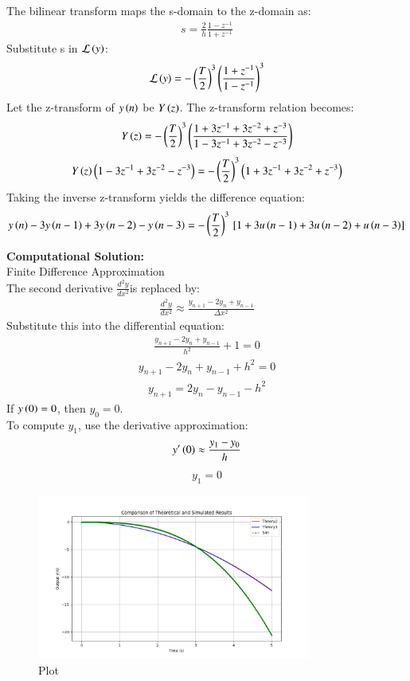 \documentclass[journal]{IEEEtran}
\numberwithin{equation}{enumi}
\numberwithin{figure}{enumi}
\begin{document}
The bilinear transform maps the s-domain to the z-domain as:
\begin{align}
	s = \frac{2}{h}\frac{1 - z^{-1}}{1 + z^{-1}}
\end{align}
Substitute s in $\mathcal{L}\left(y\right)$:
\begin{align}
	\mathcal{L}\left(y\right) = -\left(\frac{T}{2}\right)^3 \left(\frac{1 + z^{-1}}{1 - z^{-1}}\right)^3
\end{align}
Let the z-transform of $y\left(n\right)$ be $Y\left(z\right)$. The z-transform relation becomes:
\begin{align}
	Y\left(z\right) = -\left(\frac{T}{2}\right)^3 \left(\frac{1 + 3z^{-1} + 3z^{-2} + z^{-3}}{1 - 3z^{-1} + 3z^{-2} - z^{-3}}\right)
\end{align}
\begin{align}
	Y\left(z\right)\left(1 - 3z^{-1} + 3z^{-2} - z^{-3}\right) = -\left(\frac{T}{2}\right)^3 \left(1 + 3z^{-1} + 3z^{-2} + z^{-3}\right)
\end{align}
Taking the inverse z-transform yields the difference equation:
\begin{align}
	y\left(n\right) - 3y\left(n - 1\right) + 3y\left(n - 2\right) - y\left(n - 3\right) = -\left(\frac{T}{2}\right)^3 {}\left[1 + 3u\left(n - 1\right) + 3u\left(n - 2\right) + u\left(n - 3\right)\right]
\end{align}

\textbf{Computational Solution:} \\
Finite Difference Approximation \\
The second derivative $\frac{d^2y}{dx^2}$is replaced by:\\
\begin{align}
	\frac{d^2y}{dx^2} \approx \frac{y_{n+1} - 2y_n + y_{n-1}}{\Delta x^2}
\end{align}
Substitute this into the differential equation:
\begin{align}
	\frac{y_{n+1} - 2y_n + y_{n-1}}{h^2} + 1 = 0
\end{align}
\begin{align}
	y_{n+1} - 2y_n + y_{n-1} + h^2 = 0
\end{align}
\begin{align}
	y_{n+1} = 2y_n - y_{n-1} - h^2
\end{align}
If $y\left(0\right) = 0$, then $y_0 = 0$. \\
To compute $y_1$, use the derivative approximation:
\begin{align}
	y^{\prime}\left(0\right) \approx \frac{y_1 - y_0}{h}
\end{align}
\begin{align}
	y_1 = 0
\end{align}



\begin{figure}[H]
    \centering
    \includegraphics[width=0.8\textwidth]{figs/fig.png}
    \caption{Plot}
\end{figure}
\end{document}
